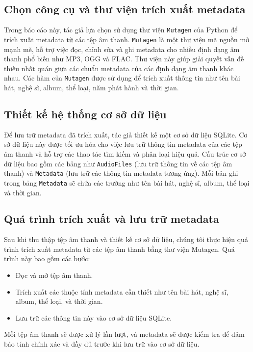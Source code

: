 \documentclass[conference]{IEEEtran}
\begin{document}
\subsection{Chọn công cụ và thư viện trích xuất metadata}
Trong báo cáo này, tác giả lựa chọn sử dụng thư viện \texttt{Mutagen} của Python để trích xuất metadata từ các tệp âm thanh. \texttt{Mutagen} là một thư viện mã nguồn mở mạnh mẽ, hỗ trợ việc đọc, chỉnh sửa và ghi metadata cho nhiều định dạng âm thanh phổ biến như MP3, OGG và FLAC. Thư viện này giúp giải quyết vấn đề thiếu nhất quán giữa các chuẩn metadata của các định dạng âm thanh khác nhau. Các hàm của \texttt{Mutagen} được sử dụng để trích xuất thông tin như tên bài hát, nghệ sĩ, album, thể loại, năm phát hành và thời gian.

\subsection{Thiết kế hệ thống cơ sở dữ liệu}
Để lưu trữ metadata đã trích xuất, tác giả thiết kế một cơ sở dữ liệu SQLite. Cơ sở dữ liệu này được tối ưu hóa cho việc lưu trữ thông tin metadata của các tệp âm thanh và hỗ trợ các thao tác tìm kiếm và phân loại hiệu quả. Cấu trúc cơ sở dữ liệu bao gồm các bảng như \texttt{AudioFiles} (lưu trữ thông tin về các tệp âm thanh) và \texttt{Metadata} (lưu trữ các thông tin metadata tương ứng). Mỗi bản ghi trong bảng \texttt{Metadata} sẽ chứa các trường như tên bài hát, nghệ sĩ, album, thể loại và thời gian.

\subsection{Quá trình trích xuất và lưu trữ metadata}
Sau khi thu thập tệp âm thanh và thiết kế cơ sở dữ liệu, chúng tôi thực hiện quá trình trích xuất metadata từ các tệp âm thanh bằng thư viện Mutagen. Quá trình này bao gồm các bước:
\begin{itemize}
    \item Đọc và mở tệp âm thanh.
    \item Trích xuất các thuộc tính metadata cần thiết như tên bài hát, nghệ sĩ, album, thể loại, và thời gian.
    \item Lưu trữ các thông tin này vào cơ sở dữ liệu SQLite.
\end{itemize}

Mỗi tệp âm thanh sẽ được xử lý lần lượt, và metadata sẽ được kiểm tra để đảm bảo tính chính xác và đầy đủ trước khi lưu trữ vào cơ sở dữ liệu.
\end{document}

